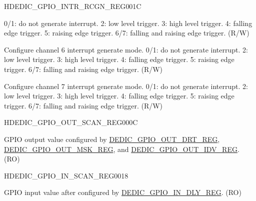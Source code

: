 \begin{register}{H}{DEDIC\_GPIO\_INTR\_RCGN\_REG}{\hexprefix{}001C}
\begin{regdesc}
\begin{reglist}
0/1: do not generate interrupt.
2: low level trigger.
3: high level trigger.
4: falling edge trigger.
5: raising edge trigger.
6/7: falling and raising edge trigger. (R/W)
\label{fielddesc:DEDICGPIOINTRMODECH6}\item [DEDIC\_GPIO\_INTR\_MODE\_CH6] Configure channel 6 interrupt generate mode.
0/1: do not generate interrupt.
2: low level trigger.
3: high level trigger.
4: falling edge trigger.
5: raising edge trigger.
6/7: falling and raising edge trigger. (R/W)
\label{fielddesc:DEDICGPIOINTRMODECH7}\item [DEDIC\_GPIO\_INTR\_MODE\_CH7] Configure channel 7 interrupt generate mode.
0/1: do not generate interrupt.
2: low level trigger.
3: high level trigger.
4: falling edge trigger.
5: raising edge trigger.
6/7: falling and raising edge trigger. (R/W)
\end{reglist}\end{regdesc}
\end{register}


\begin{register}{H}{DEDIC\_GPIO\_OUT\_SCAN\_REG}{\hexprefix{}000C}\label{regdesc:DEDICGPIOOUTSCANREG}
%
%
\regnewline%
\begin{regdesc}\begin{reglist}
\label{fielddesc:DEDICGPIOOUTSTATUS}\item [DEDIC\_GPIO\_OUT\_STATUS] GPIO output value configured by \hyperref[regdesc:DEDICGPIOOUTDRTREG]{DEDIC\_GPIO\_OUT\_DRT\_REG}, \hyperref[regdesc:DEDICGPIOOUTMSKREG]{DEDIC\_GPIO\_OUT\_MSK\_REG}, and \hyperref[regdesc:DEDICGPIOOUTIDVREG]{DEDIC\_GPIO\_OUT\_IDV\_REG}. (RO)
\end{reglist}\end{regdesc}
\end{register}


\begin{register}{H}{DEDIC\_GPIO\_IN\_SCAN\_REG}{\hexprefix{}0018}\label{regdesc:DEDICGPIOINSCANREG}
%
%
\regnewline%
\begin{regdesc}\begin{reglist}
\label{fielddesc:DEDICGPIOINSTATUS}\item [DEDIC\_GPIO\_IN\_STATUS] GPIO input value after configured by \hyperref[regdesc:DEDICGPIOINDLYREG]{DEDIC\_GPIO\_IN\_DLY\_REG}. (RO)
\end{reglist}\end{regdesc}
\end{register}


